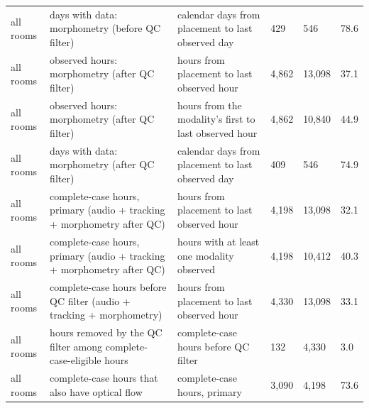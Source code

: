 \begin{tabular}{llllll}
all rooms & days with data: morphometry (before QC filter) & calendar days from placement to last observed day & 429 & 546 & 78.6 \\
all rooms & observed hours: morphometry (after QC filter) & hours from placement to last observed hour & 4,862 & 13,098 & 37.1 \\
all rooms & observed hours: morphometry (after QC filter) & hours from the modality's first to last observed hour & 4,862 & 10,840 & 44.9 \\
all rooms & days with data: morphometry (after QC filter) & calendar days from placement to last observed day & 409 & 546 & 74.9 \\
all rooms & complete-case hours, primary (audio + tracking + morphometry after QC) & hours from placement to last observed hour & 4,198 & 13,098 & 32.1 \\
all rooms & complete-case hours, primary (audio + tracking + morphometry after QC) & hours with at least one modality observed & 4,198 & 10,412 & 40.3 \\
all rooms & complete-case hours before QC filter (audio + tracking + morphometry) & hours from placement to last observed hour & 4,330 & 13,098 & 33.1 \\
all rooms & hours removed by the QC filter among complete-case-eligible hours & complete-case hours before QC filter & 132 & 4,330 & 3.0 \\
all rooms & complete-case hours that also have optical flow & complete-case hours, primary & 3,090 & 4,198 & 73.6 \\
\hline
\end{tabular}
